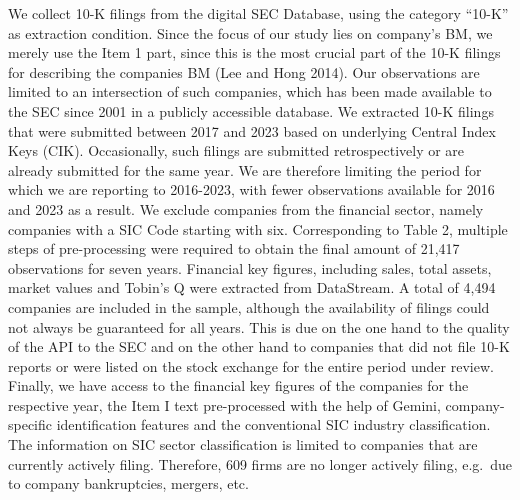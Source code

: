 \documentclass[
]{article}
\begin{document}
We collect 10-K filings from the digital SEC Database, using the
category ``10-K'' as extraction condition. Since the focus of our study
lies on company's BM, we merely use the Item 1 part, since this is the
most crucial part of the 10-K filings for describing the companies BM
(Lee and Hong 2014). Our observations are limited to an intersection of
such companies, which has been made available to the SEC since 2001 in a
publicly accessible database. We extracted 10-K filings that were
submitted between 2017 and 2023 based on underlying Central Index Keys
(CIK). Occasionally, such filings are submitted retrospectively or are
already submitted for the same year. We are therefore limiting the
period for which we are reporting to 2016-2023, with fewer observations
available for 2016 and 2023 as a result. We exclude companies from the
financial sector, namely companies with a SIC Code starting with six.
Corresponding to Table 2, multiple steps of pre-processing were required
to obtain the final amount of 21,417 observations for seven years.
Financial key figures, including sales, total assets, market values and
Tobin's Q were extracted from DataStream. A total of 4,494 companies are
included in the sample, although the availability of filings could not
always be guaranteed for all years. This is due on the one hand to the
quality of the API to the SEC and on the other hand to companies that
did not file 10-K reports or were listed on the stock exchange for the
entire period under review. Finally, we have access to the financial key
figures of the companies for the respective year, the Item I text
pre-processed with the help of Gemini, company-specific identification
features and the conventional SIC industry classification. The
information on SIC sector classification is limited to companies that
are currently actively filing. Therefore, 609 firms are no longer
actively filing, e.g.~due to company bankruptcies, mergers, etc.
\end{document}
